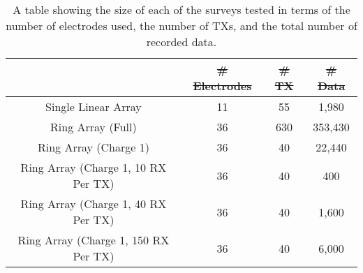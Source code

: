\documentclass[preprint,authoryear,12pt]{elsarticle}
\providecommand{\DIFaddtex}[1]{{\protect\color{blue}\uwave{#1}}} %
\providecommand{\DIFdeltex}[1]{{\protect\color{red}\sout{#1}}}                      %
\providecommand{\DIFaddFL}[1]{\DIFadd{#1}} %
\providecommand{\DIFdelFL}[1]{\DIFdel{#1}} %
\providecommand{\DIFaddbeginFL}{} %
\providecommand{\DIFaddendFL}{} %
\providecommand{\DIFdelbeginFL}{} %
\providecommand{\DIFdelendFL}{} %
\providecommand{\DIFadd}[1]{\texorpdfstring{\DIFaddtex{#1}}{#1}} %
\providecommand{\DIFdel}[1]{\texorpdfstring{\DIFdeltex{#1}}{}} %
\begin{document}
\begin{table} [htp]
   \footnotesize
    \begin{center}
        \begin{tabular}{| c | c | c | c |}
            \hline
             & \DIFdelbeginFL \DIFdelFL{\# Electrodes }\DIFdelendFL \DIFaddbeginFL \textbf{\DIFaddFL{\mbox{\boldmath$\#$} Electrodes}} \DIFaddendFL & \DIFdelbeginFL \DIFdelFL{\# TX }\DIFdelendFL \DIFaddbeginFL \textbf{\DIFaddFL{\mbox{\boldmath$\#$} TX}} \DIFaddendFL & \DIFdelbeginFL \DIFdelFL{\# Data}\DIFdelendFL \DIFaddbeginFL \textbf{\DIFaddFL{\mbox{\boldmath$\#$} Data}}\DIFaddendFL \\
            \hline
            Single Linear Array & 11 & 55 & 1,980 \\
            \hline
            Ring Array (Full) & 36 & 630 & 353,430 \\
            \hline
            Ring Array (Charge 1) & 36 & 40 &  22,440\\
            \hline
            Ring Array (Charge 1, 10 RX Per TX) & 36 & 40 &  400\\
            \hline
            Ring Array (Charge 1, 40 RX Per TX) & 36 & 40 &  1,600\\
            \hline
            Ring Array (Charge 1, 150 RX Per TX) & 36 & 40 &  6,000\\
            \hline
        \end{tabular}
    \end{center}
\caption{A table showing the size of each of the surveys tested in terms of the number of electrodes used, the number of TXs, and the total number of recorded data.}
\label{table:SurveyDesign_RxSelection_SurveyStats}
\end{table}
\end{document}
